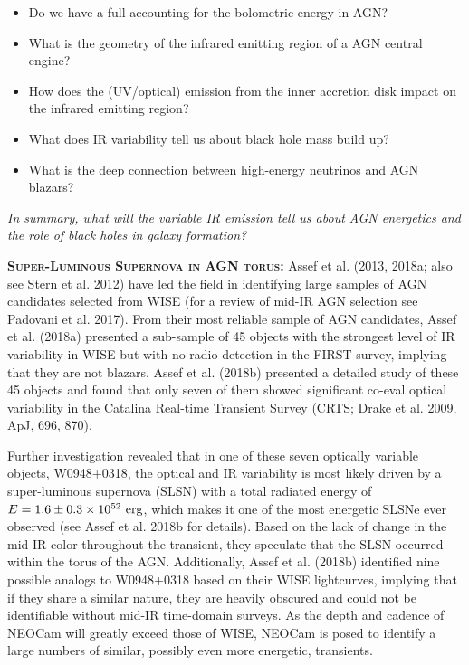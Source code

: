 \documentclass[12pt]{article}
\begin{document}
\begin{itemize}
\item Do we have a full accounting for the bolometric energy in AGN?
\item What is the geometry of the infrared emitting region of a AGN central engine?
\item How does the (UV/optical) emission from the inner accretion disk impact on the infrared emitting region?
\item What does IR variability tell us about black hole mass build up?
\item What is the deep connection between high-energy neutrinos and AGN blazars? 
\end{itemize}

\noindent
{\it In summary, what will the variable IR emission tell us about AGN energetics and the 
role of black holes in galaxy formation?}


\smallskip
\smallskip
\noindent
\textbf{\textsc{Super-Luminous Supernova in AGN torus: }} 
Assef et al. (2013, 2018a; also see Stern et al. 2012) have led the field in identifying large samples of AGN candidates selected from WISE (for a review of mid-IR AGN selection see Padovani et al. 2017). From their most reliable sample of AGN candidates, Assef et al. (2018a) presented a sub-sample of 45 objects with the strongest level of IR variability in WISE but with no radio detection in the FIRST survey, implying that they are not blazars. Assef et al. (2018b) presented a detailed study of these 45 objects and found that only seven of them showed significant co-eval optical variability in the Catalina Real-time Transient Survey (CRTS; Drake et al. 2009, ApJ, 696, 870).

\smallskip
\smallskip
\noindent
Further investigation revealed that in one of these seven optically variable objects, W0948+0318, the optical and IR variability is most likely driven by a super-luminous supernova (SLSN) with a total radiated energy of $E=1.6\pm 0.3 \times 10^{52}~\rm erg$, which makes it one of the most energetic SLSNe ever observed (see Assef et al. 2018b for details). Based on the lack of change in the mid-IR color throughout the transient, they speculate that the SLSN occurred within the torus of the AGN. Additionally, Assef et al. (2018b) identified nine possible analogs to W0948+0318 based on their WISE lightcurves, implying that if they share a similar nature, they are heavily obscured and could not be identifiable without mid-IR time-domain surveys. As the depth and cadence of NEOCam will greatly exceed those of WISE, NEOCam is posed to identify a large numbers of similar, possibly even more energetic, transients.
\end{document}

